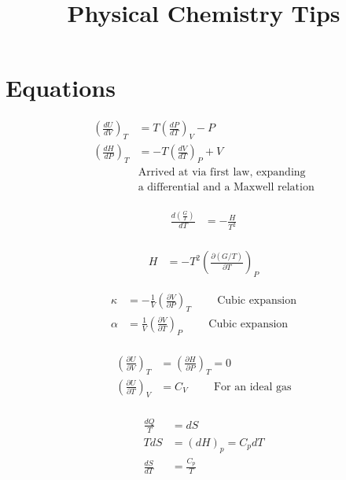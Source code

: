 \documentclass[10pt]{article} %
\title{Physical Chemistry Tips}
\begin{document}
\maketitle{}

\section{Equations}
\begin{align*}
  \left(\frac{dU}{dV}\right)_T &= T\left(\frac{dP}{dT}\right)_V - P\\
  \left(\frac{dH}{dP}\right)_T &= -T\left(\frac{dV}{dT}\right)_P + V\\
  &\mbox{Arrived at via first law, expanding}\\
  &\mbox{a differential and a Maxwell relation}\\
\end{align*}

\begin{align*}
  \frac{d\left(\frac{G}{T}\right)}{dT} &= -\frac{H}{T^2}\\
\end{align*}

\begin{align*}
  H &= -T^2\left(\frac{\partial\left(G/T\right)}{\partial T}\right)_P
\end{align*}

\begin{align*}
  \kappa &= -\frac{1}{V}\left(\frac{\partial V}{\partial P}\right)_T \hspace{1cm} \mbox{Cubic expansion}\\
\alpha &= \frac{1}{V}\left(\frac{\partial V}{\partial T}\right)_P \hspace{1cm} \mbox{Cubic expansion}\\
\end{align*}

\begin{align*}
  \left(\frac{\partial U}{\partial V}\right)_T &= \left(\frac{\partial H}{\partial P}\right)_T = 0\\
  \left(\frac{\partial U}{\partial T}\right)_V &= C_V \hspace{1cm} \mbox{For an ideal gas}\\
\end{align*}

\begin{align*}
  \frac{dQ}{T} &= dS\\
  TdS &= (dH)_p = C_pdT\\
  \frac{dS}{dT} &=\frac{C_p}{T}\\
\end{align*}
\end{document}
